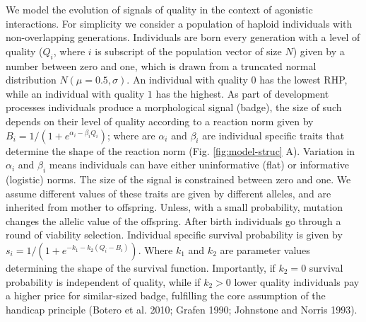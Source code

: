 \documentclass[
  12pt,
]{article}
\begin{document}
We model the evolution of signals of quality in the context of agonistic
interactions. For simplicity we consider a population of haploid
individuals with non-overlapping generations. Individuals are born every
generation with a level of quality (\(Q_i\), where \(i\) is subscript of
the population vector of size \(N\)) given by a number between zero and
one, which is drawn from a truncated normal distribution
\(N(\mu = 0.5,\sigma)\). An individual with quality \(0\) has the lowest
RHP, while an individual with quality \(1\) has the highest. As part of
development processes individuals produce a morphological signal
(badge), the size of such depends on their level of quality according to
a reaction norm given by \(B_i=1/(1+e^{\alpha_i-\beta_i Q_i})\); where
are \(\alpha_i\) and \(\beta_i\) are individual specific traits that
determine the shape of the reaction norm (Fig. \ref{fig:model-struc} A).
Variation in \(\alpha_i\) and \(\beta_i\) means individuals can have
either uninformative (flat) or informative (logistic) norms. The size of
the signal is constrained between zero and one. We assume different
values of these traits are given by different alleles, and are inherited
from mother to offspring. Unless, with a small probability, mutation
changes the allelic value of the offspring. After birth individuals go
through a round of viability selection. Individual specific survival
probability is given by \(s_i=1/(1+e^{-k_1-k_2(Q_i-B_i)})\). Where
\(k_1\) and \(k_2\) are parameter values determining the shape of the
survival function. Importantly, if \(k_2=0\) survival probability is
independent of quality, while if \(k_2>0\) lower quality individuals pay
a higher price for similar-sized badge, fulfilling the core assumption
of the handicap principle (Botero et al. 2010; Grafen 1990; Johnstone
and Norris 1993).
\end{document}

